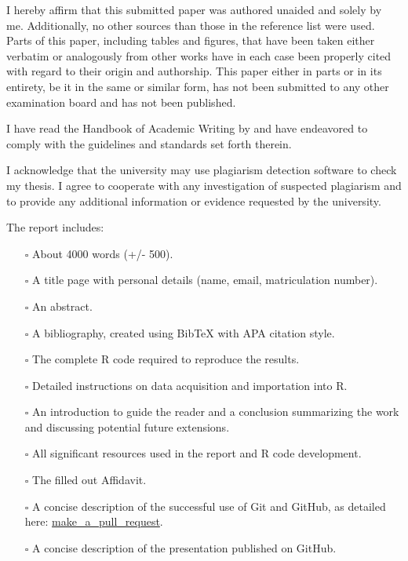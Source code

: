 \documentclass[
  a4paper,
  onecolumn,
  oneside]{scrartcl}
\providecommand{\tightlist}{%
  \setlength{\itemsep}{0pt}\setlength{\parskip}{0pt}}\usepackage{longtable,booktabs,array}
\begin{document}
\begin{tcolorbox}[enhanced jigsaw, arc=.35mm, colback=white, opacityback=0, left=2mm, breakable, rightrule=.15mm, bottomrule=.15mm, leftrule=.75mm, toprule=.15mm, colframe=quarto-callout-tip-color-frame]

I hereby affirm that this submitted paper was authored unaided and
solely by me. Additionally, no other sources than those in the reference
list were used. Parts of this paper, including tables and figures, that
have been taken either verbatim or analogously from other works have in
each case been properly cited with regard to their origin and
authorship. This paper either in parts or in its entirety, be it in the
same or similar form, has not been submitted to any other examination
board and has not been published.

I have read the Handbook of Academic Writing by
\citet{Hildebrandt2019Handbook} and have endeavored to comply with the
guidelines and standards set forth therein.

I acknowledge that the university may use plagiarism detection software
to check my thesis. I agree to cooperate with any investigation of
suspected plagiarism and to provide any additional information or
evidence requested by the university.

The report includes:

\begin{itemize}
\tightlist
\item[$\square$]
  About 4000 words (+/- 500).
\item[$\square$]
  A title page with personal details (name, email, matriculation
  number).
\item[$\square$]
  An abstract.
\item[$\square$]
  A bibliography, created using BibTeX with APA citation style.
\item[$\square$]
  The complete R code required to reproduce the results.
\item[$\square$]
  Detailed instructions on data acquisition and importation into R.
\item[$\square$]
  An introduction to guide the reader and a conclusion summarizing the
  work and discussing potential future extensions.
\item[$\square$]
  All significant resources used in the report and R code development.
\item[$\square$]
  The filled out Affidavit.
\item[$\square$]
  A concise description of the successful use of Git and GitHub, as
  detailed here:
  \href{https://github.com/hubchev/make_a_pull_request}{make\_a\_pull\_request}.
\item[$\square$]
  A concise description of the presentation published on GitHub.
\end{itemize}


\end{tcolorbox}
\end{document}
